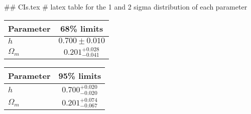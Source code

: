## CIs.tex
# latex table for the 1 and 2 sigma distribution of each parameter

\begin{tabular} { l  c}
 Parameter &  68\% limits\\
\hline
{\boldmath$h              $} & $0.700\pm 0.010            $\\
{\boldmath$\Omega_m       $} & $0.201^{+0.028}_{-0.041}   $\\
\hline
\end{tabular}

\begin{tabular} { l  c}
 Parameter &  95\% limits\\
\hline
{\boldmath$h              $} & $0.700^{+0.020}_{-0.020}   $\\
{\boldmath$\Omega_m       $} & $0.201^{+0.074}_{-0.067}   $\\
\hline
\end{tabular}
